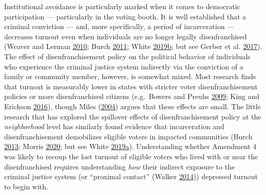 \documentclass[
  12pt,
]{article}
\begin{document}
Institutional avoidance is particularly marked when it comes to democratic participation --- particularly in the voting booth. It is well established that a criminal conviction --- and, more specifically, a period of incarceration --- decreases turnout even when individuals are no longer legally disenfranchised (Weaver and Lerman \protect\hyperlink{ref-Weaver2010}{2010}; Burch \protect\hyperlink{ref-Burch2011}{2011}; White \protect\hyperlink{ref-White2019}{2019}\protect\hyperlink{ref-White2019}{b}; but see Gerber et al. \protect\hyperlink{ref-Gerber2017}{2017}). The effect of disenfranchisement policy on the political behavior of individuals who experience the criminal justice system indirectly via the conviction of a family or community member, however, is somewhat mixed. Most research finds that turnout is measurably lower in states with stricter voter disenfranchisement policies or more disenfranchised citizens (e.g.~Bowers and Preuhs \protect\hyperlink{ref-Bowers2009}{2009}; King and Erickson \protect\hyperlink{ref-King2016}{2016}), though Miles (\protect\hyperlink{ref-Miles2004}{2004}) argues that these effects are small. The little research that has explored the spillover effects of disenfranchisement policy at the \emph{neighborhood} level has similarly found evidence that incarceration and disenfranchisement demobilizes eligible voters in impacted communities (Burch \protect\hyperlink{ref-Burch2013}{2013}; Morris \protect\hyperlink{ref-Morris2020}{2020}; but see White \protect\hyperlink{ref-White2019a}{2019}\protect\hyperlink{ref-White2019a}{a}). Understanding whether Amendment 4 was likely to recoup the lost turnout of eligible voters who lived with or near the disenfranchised requires understanding \emph{how} their indirect exposure to the criminal justice system (or ``proximal contact'' (Walker \protect\hyperlink{ref-Walker2014}{2014})) depressed turnout to begin with.
\end{document}
